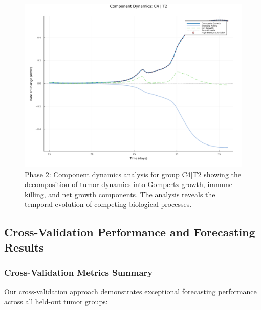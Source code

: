 \documentclass{juliacon}
\begin{document}
\begin{figure}[H]\centering
\includegraphics[width=\linewidth]{group_C4_T2_component_dynamics.png}
\caption{Phase 2: Component dynamics analysis for group C4|T2 showing the decomposition of tumor dynamics into Gompertz growth, immune killing, and net growth components. The analysis reveals the temporal evolution of competing biological processes.}
\label{fig:components}
\end{figure}

\subsection{Cross-Validation Performance and Forecasting Results}

\subsubsection{Cross-Validation Metrics Summary}

Our cross-validation approach demonstrates exceptional forecasting performance across all held-out tumor groups:
\end{document}
